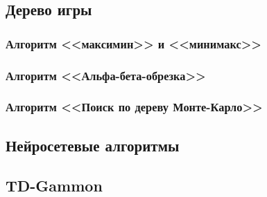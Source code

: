 \documentclass{vsureport}
\begin{document}
\subsection{Дерево игры}


\subsubsection{Алгоритм <<максимин>> и <<минимакс>>}


\subsubsection{Алгоритм <<Альфа-бета-обрезка>>}


\subsubsection{Алгоритм <<Поиск по дереву Монте-Карло>>}


\subsection{Нейросетевые алгоритмы}


\subsection{TD-Gammon}





\end{document}
